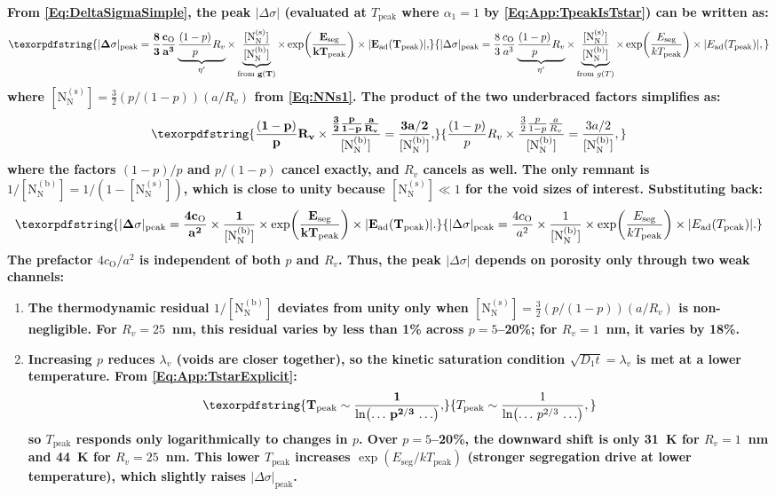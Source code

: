 \documentclass[preprint,12pt,sort&compress]{elsarticle}
\newcommand{\?}{\stackrel{?}{=}}
\providecommand{\DIFaddtex}[1]{{\bf #1}} %
\providecommand{\DIFadd}[1]{\texorpdfstring{\DIFaddtex{#1}}{#1}} %
\begin{document}
\DIFadd{From \cref{Eq:DeltaSigmaSimple}, the peak $|\Delta\sigma|$ (evaluated at $T_\text{peak}$ where $\alpha_1 = 1$ by \cref{Eq:App:TpeakIsTstar}) can be written as:
}\begin{equation}
\DIFadd{|\Delta\sigma|_\text{peak} = \frac{8}{3} \frac{c_\text{O}}{a^3} \underbrace{\frac{(1-p)}{p} R_v}_{\eta'} \times \underbrace{\frac{[\text{N}_\text{N}^{(\text{s})}]}{[\text{N}_\text{N}^{(\text{b})}]}}_{\text{from } g(T)} \times \exp\!\left(\frac{E_\text{seg}}{kT_\text{peak}}\right) \times |E_\text{ad}(T_\text{peak})|,
\label{Eq:App:DsigPeak}
}\end{equation}
\DIFadd{where $[\text{N}_\text{N}^{(\text{s})}] = \frac{3}{2}(p/(1-p))(a/R_v)$ from \cref{Eq:NNs1}. The product of the two underbraced factors simplifies as:
}\begin{equation}
\DIFadd{\frac{(1-p)}{p} R_v \times \frac{\frac{3}{2}\frac{p}{1-p}\frac{a}{R_v}}{[\text{N}_\text{N}^{(\text{b})}]} = \frac{3a/2}{[\text{N}_\text{N}^{(\text{b})}]},
\label{Eq:App:cancel}
}\end{equation}
\DIFadd{where the factors $(1-p)/p$ and $p/(1-p)$ cancel exactly, and $R_v$ cancels as well. The only remnant is $1/[\text{N}_\text{N}^{(\text{b})}] = 1/(1 - [\text{N}_\text{N}^{(\text{s})}])$, which is close to unity because $[\text{N}_\text{N}^{(\text{s})}] \ll 1$ for the void sizes of interest. Substituting back:
}\begin{equation}
\DIFadd{|\Delta\sigma|_\text{peak} = \frac{4 c_\text{O}}{a^2} \times \frac{1}{[\text{N}_\text{N}^{(\text{b})}]} \times \exp\!\left(\frac{E_\text{seg}}{kT_\text{peak}}\right) \times |E_\text{ad}(T_\text{peak})|.
\label{Eq:App:DsigPeakReduced}
}\end{equation}
\DIFadd{The prefactor $4c_\text{O}/a^2$ is independent of both $p$ and $R_v$. Thus, the peak $|\Delta\sigma|$ depends on porosity only through two weak channels:
}\begin{enumerate}[label=(\alph*)]
\item \DIFadd{The thermodynamic residual $1/[\text{N}_\text{N}^{(\text{b})}]$ deviates from unity only when $[\text{N}_\text{N}^{(\text{s})}] = \frac{3}{2}(p/(1-p))(a/R_v)$ is non-negligible. For $R_v = 25$~nm, this residual varies by less than 1\% across $p = 5$--20\%; for $R_v = 1$~nm, it varies by 18\%.
}\item \DIFadd{Increasing $p$ reduces $\lambda_v$ (voids are closer together), so the kinetic saturation condition $\sqrt{D_1 t} = \lambda_v$ is met at a lower temperature. From \cref{Eq:App:TstarExplicit}:
}\begin{equation}
\DIFadd{T_\text{peak} \sim \frac{1}{\ln\!\left(\ldots\, p^{2/3} \,\ldots\right)},
}\end{equation}
\DIFadd{so $T_\text{peak}$ responds only logarithmically to changes in $p$. Over $p = 5$--20\%, the downward shift is only 31~K for $R_v = 1$~nm and 44~K for $R_v = 25$~nm. This lower $T_\text{peak}$ increases $\exp(E_\text{seg}/kT_\text{peak})$ (stronger segregation drive at lower temperature), which slightly raises $|\Delta\sigma|_\text{peak}$.
}\end{enumerate}
\end{document}
